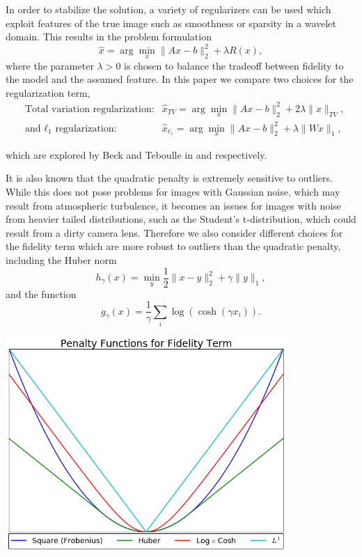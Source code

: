 \documentclass[10pt,a4paper]{article}
\begin{document}
In order to stabilize the solution, a variety of regularizers can be used which exploit features of the true image such as smoothness or sparsity in a wavelet domain. This results in the problem formulation
\begin{equation}
\hat{x} = \arg\min_{x} \| Ax - b \|_2^2 + \lambda R(x),
\end{equation}
where the parameter $\lambda > 0$ is chosen to balance the tradeoff between fidelity to the model and the assumed feature. In this paper we compare two choices for the regularization term, 
\begin{align}
&\text{Total variation regularization:} &\hat{x}_{TV} = \arg\min_x \| Ax - b \|_2^2 + 2\lambda \| x \|_{TV} , \\
&\text{and } \ell_1 \text{ regularization:} &\hat{x}_{\ell_1} = \arg\min_x \| Ax - b \|_2^2 + \lambda \| Wx \|_1  ,
\end{align}

which are explored by Beck and Teboulle in \cite{TV} and \cite{FISTA} respectively.

It is also known that the quadratic penalty is extremely sensitive to outliers. While this does not pose problems for images with Gaussian noise, which may result from atmospheric turbulence, it becomes an issues for images with noise from heavier tailed distributions, such as the Student's t-distribution, which could result from a dirty camera lens. Therefore we also consider different choices for the fidelity term which are more robust to outliers than the quadratic penalty, including the Huber norm
\begin{equation} \label{huber}
h_{\gamma}(x) = \min_y \frac{1}{2} \| x - y \|_2^2 + \gamma \| y \|_1,
\end{equation}
and the function
\begin{equation} \label{log_cosh}
g_{\gamma}(x) = \frac{1}{\gamma} \sum_i \log\left(\cosh\left(\gamma x_i\right)\right).
\end{equation}

\begin{center}
\includegraphics[width=0.8\textwidth]{../figures/penalty_functions.png} 
\end{center}
\end{document}
